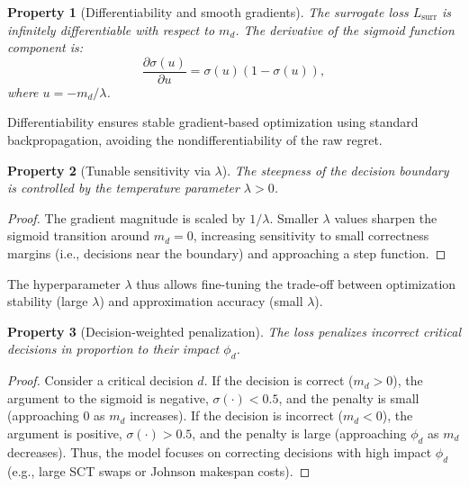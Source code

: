 \documentclass{article}
\newtheorem{property}{Property}
\begin{document}
\begin{property}[Differentiability and smooth gradients]
\label{prop:differentiability}
The surrogate loss \(L_{\mathrm{surr}}\) is infinitely differentiable with respect to $m_d$.
The derivative of the sigmoid function component is:
\[
\frac{\partial \sigma(u)}{\partial u} = \sigma(u)(1-\sigma(u)),
\]
where $u = -m_d/\lambda$.
\end{property}
\noindent Differentiability ensures stable gradient-based optimization using standard backpropagation, avoiding the nondifferentiability of the raw regret.

\begin{property}[Tunable sensitivity via \(\lambda\)]
The steepness of the decision boundary is controlled by the temperature parameter \(\lambda>0\).
\end{property}
\begin{proof}
The gradient magnitude is scaled by $1/\lambda$.
Smaller \(\lambda\) values sharpen the sigmoid transition around $m_d=0$, increasing sensitivity to small correctness margins (i.e., decisions near the boundary) and approaching a step function.
\end{proof}
\noindent The hyperparameter \(\lambda\) thus allows fine-tuning the trade-off between optimization stability (large $\lambda$) and approximation accuracy (small $\lambda$).

\begin{property}[Decision-weighted penalization]
\label{prop:order}
The loss penalizes incorrect critical decisions in proportion to their impact $\phi_d$.
\end{property}
\begin{proof}
Consider a critical decision $d$.
If the decision is correct ($m_d > 0$), the argument to the sigmoid is negative, $\sigma(\cdot) < 0.5$, and the penalty is small (approaching 0 as $m_d$ increases).
If the decision is incorrect ($m_d < 0$), the argument is positive, $\sigma(\cdot) > 0.5$, and the penalty is large (approaching $\phi_d$ as $m_d$ decreases).
Thus, the model focuses on correcting decisions with high impact $\phi_d$ (e.g., large SCT swaps or Johnson makespan costs).
\end{proof}
\end{document}
